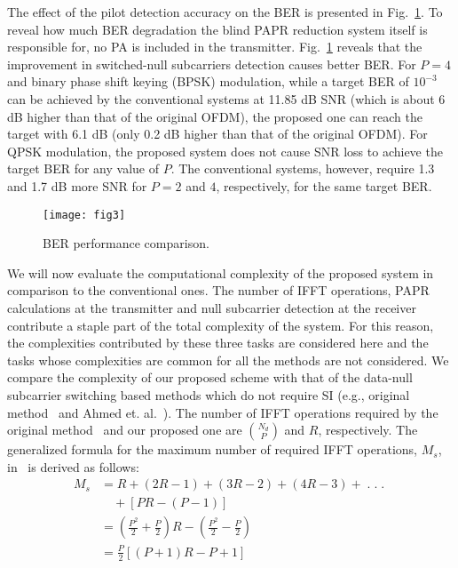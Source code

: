 \documentclass[journal,comsoc]{IEEEtran}
\begin{document}
   The effect of the pilot detection accuracy on the BER is presented in Fig.~\ref{fig3}. To reveal how much BER degradation the blind PAPR reduction system itself is responsible for, no PA is included in the transmitter. Fig.~\ref{fig3} reveals that the improvement in switched-null subcarriers detection causes better BER. For $P=4$ and binary phase shift keying (BPSK) modulation, while a target BER of $10^{-3}$ can be achieved by the conventional systems at 11.85 dB SNR (which is about 6 dB higher than that of the original OFDM), the proposed one can reach the target with 6.1 dB (only 0.2 dB higher than that of the original OFDM). For QPSK modulation, the proposed system does not cause SNR loss to achieve the target BER for any value of $P$. The conventional systems, however, require 1.3 and 1.7 dB more SNR for $P=2$ and $4$, respectively, for the same target BER.
   \begin{figure}[!t]
\centering
\texttt{[image: fig3]}
\caption{BER performance comparison.}

\label{fig3}
\end{figure}


   We will now evaluate the computational complexity of the proposed system in comparison to the conventional ones. The number of IFFT operations, PAPR calculations at the transmitter and null subcarrier detection at the receiver contribute a staple part of the total complexity of the system. For this reason, the complexities contributed by these three tasks are considered here and the tasks whose complexities are common for all the methods are not considered. We compare the complexity of our proposed scheme with that of the data-null subcarrier switching based methods which do not require SI (e.g., original method~\cite{IEEEhowto:wong1} and Ahmed et. al.~\cite{IEEEhowto:sabbir2}). The number of IFFT operations required by the original method~\cite{IEEEhowto:wong1} and our proposed one are $N_d \choose P$ and $R$, respectively. The generalized formula for the maximum number of required IFFT operations, $M_s$, in~\cite{IEEEhowto:sabbir2} is derived as follows: 
   \begin{equation*}
   \begin{split}
   M_s&=R+(2R-1)+(3R-2)+(4R-3)+\;.\;.\;.\;\\
   & \quad +[PR-(P-1)]\\
    & =\left(\frac{P^2}{2}+\frac{P}{2}\right)R-\left(\frac{P^2}{2}-\frac{P}{2}\right)\\
    & =\frac{P}{2}[(P+1)R-P+1]
   \end{split}
   \end{equation*}
\end{document}
